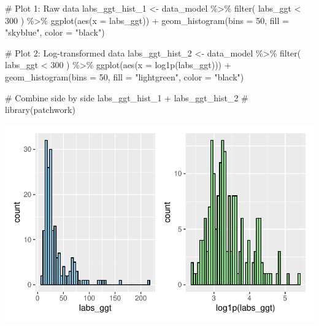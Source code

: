 \documentclass[
  letterpaper,
  DIV=11,
  numbers=noendperiod]{scrartcl}
\newenvironment{Shaded}{\begin{snugshade}}{\end{snugshade}}
\newcommand{\AttributeTok}[1]{\textcolor[rgb]{0.40,0.45,0.13}{#1}}
\newcommand{\CommentTok}[1]{\textcolor[rgb]{0.37,0.37,0.37}{#1}}
\newcommand{\DecValTok}[1]{\textcolor[rgb]{0.68,0.00,0.00}{#1}}
\newcommand{\FunctionTok}[1]{\textcolor[rgb]{0.28,0.35,0.67}{#1}}
\newcommand{\NormalTok}[1]{\textcolor[rgb]{0.00,0.23,0.31}{#1}}
\newcommand{\OtherTok}[1]{\textcolor[rgb]{0.00,0.23,0.31}{#1}}
\newcommand{\SpecialCharTok}[1]{\textcolor[rgb]{0.37,0.37,0.37}{#1}}
\newcommand{\StringTok}[1]{\textcolor[rgb]{0.13,0.47,0.30}{#1}}
\begin{document}
\begin{Shaded}
\begin{Highlighting}[]
\CommentTok{\# Plot 1: Raw data}
\NormalTok{labs\_ggt\_hist\_1 }\OtherTok{\textless{}{-}}\NormalTok{ data\_model }\SpecialCharTok{\%\textgreater{}\%} 
    \FunctionTok{filter}\NormalTok{(}
\NormalTok{        labs\_ggt }\SpecialCharTok{\textless{}} \DecValTok{300}
\NormalTok{    ) }\SpecialCharTok{\%\textgreater{}\%} 
    \FunctionTok{ggplot}\NormalTok{(}\FunctionTok{aes}\NormalTok{(}\AttributeTok{x =}\NormalTok{ labs\_ggt)) }\SpecialCharTok{+} 
    \FunctionTok{geom\_histogram}\NormalTok{(}\AttributeTok{bins =} \DecValTok{50}\NormalTok{, }\AttributeTok{fill =} \StringTok{"skyblue"}\NormalTok{, }\AttributeTok{color =} \StringTok{"black"}\NormalTok{)}

\CommentTok{\# Plot 2: Log{-}transformed data}
\NormalTok{labs\_ggt\_hist\_2 }\OtherTok{\textless{}{-}}\NormalTok{ data\_model }\SpecialCharTok{\%\textgreater{}\%} 
    \FunctionTok{filter}\NormalTok{(}
\NormalTok{        labs\_ggt }\SpecialCharTok{\textless{}} \DecValTok{300}
\NormalTok{    ) }\SpecialCharTok{\%\textgreater{}\%}
    \FunctionTok{ggplot}\NormalTok{(}\FunctionTok{aes}\NormalTok{(}\AttributeTok{x =} \FunctionTok{log1p}\NormalTok{(labs\_ggt))) }\SpecialCharTok{+} 
    \FunctionTok{geom\_histogram}\NormalTok{(}\AttributeTok{bins =} \DecValTok{50}\NormalTok{, }\AttributeTok{fill =} \StringTok{"lightgreen"}\NormalTok{, }\AttributeTok{color =} \StringTok{"black"}\NormalTok{)}

\CommentTok{\# Combine side by side}
\NormalTok{labs\_ggt\_hist\_1 }\SpecialCharTok{+}\NormalTok{ labs\_ggt\_hist\_2 }\CommentTok{\# library(patchwork)}
\end{Highlighting}
\end{Shaded}

\includegraphics{Outcomes_V1V2V3_files/figure-pdf/labs_ggt_1-1.pdf}
\end{document}

